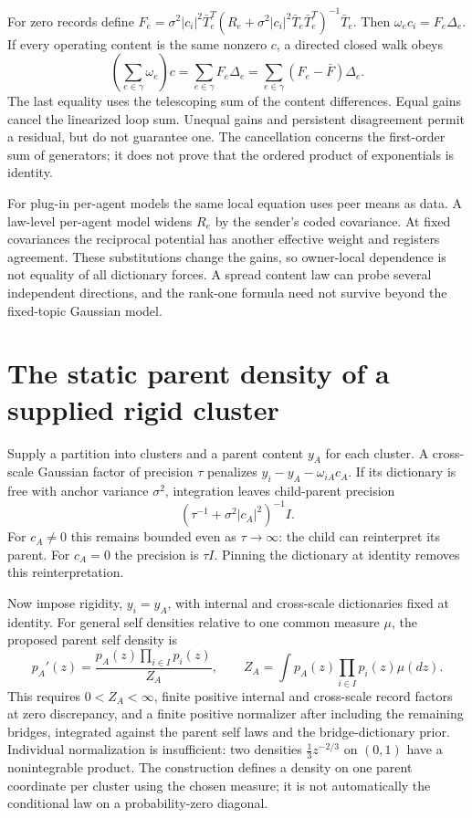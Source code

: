 For zero records define
$F_e=\sigma^2|c_i|^2\bar T_e^T(R_e+\sigma^2|c_i|^2\bar T_e\bar T_e^T)^{-1}\bar T_e$.
Then $\omega_ec_i=F_e\Delta_e$. If every operating content is the same nonzero $c$, a directed closed walk obeys
\begin{equation}
\left(\sum_{e\in\gamma}\omega_e\right)c
=\sum_{e\in\gamma}F_e\Delta_e
=\sum_{e\in\gamma}(F_e-\bar F)\Delta_e.
\label{c19:gains}
\end{equation}
The last equality uses the telescoping sum of the content differences. Equal gains cancel the linearized loop sum. Unequal gains and persistent disagreement permit a residual, but do not guarantee one. The cancellation concerns the first-order sum of generators; it does not prove that the ordered product of exponentials is identity.

For plug-in per-agent models the same local equation uses peer means as data. A law-level per-agent model widens $R_e$ by the sender's coded covariance. At fixed covariances the reciprocal potential has another effective weight and registers agreement. These substitutions change the gains, so owner-local dependence is not equality of all dictionary forces. A spread content law can probe several independent directions, and the rank-one formula need not survive beyond the fixed-topic Gaussian model.

\section{The static parent density of a supplied rigid cluster}

Supply a partition into clusters and a parent content $y_A$ for each cluster. A cross-scale Gaussian factor of precision $\tau$ penalizes $y_i-y_A-\omega_{iA}c_A$. If its dictionary is free with anchor variance $\sigma^2$, integration leaves child-parent precision
\begin{equation}
(\tau^{-1}+\sigma^2|c_A|^2)^{-1}I.
\label{c19:cap}
\end{equation}
For $c_A\ne0$ this remains bounded even as $\tau\to\infty$: the child can reinterpret its parent. For $c_A=0$ the precision is $\tau I$. Pinning the dictionary at identity removes this reinterpretation.

Now impose rigidity, $y_i=y_A$, with internal and cross-scale dictionaries fixed at identity. For general self densities relative to one common measure $\mu$, the proposed parent self density is
\begin{equation}
p_A'(z)=\frac{p_A(z)\prod_{i\in I}p_i(z)}{Z_A},\qquad
Z_A=\int p_A(z)\prod_{i\in I}p_i(z)\mu(dz).
\label{c19:rigid}
\end{equation}
This requires $0<Z_A<\infty$, finite positive internal and cross-scale record factors at zero discrepancy, and a finite positive normalizer after including the remaining bridges, integrated against the parent self laws and the bridge-dictionary prior. Individual normalization is insufficient: two densities $\frac13z^{-2/3}$ on $(0,1)$ have a nonintegrable product. The construction defines a density on one parent coordinate per cluster using the chosen measure; it is not automatically the conditional law on a probability-zero diagonal.

